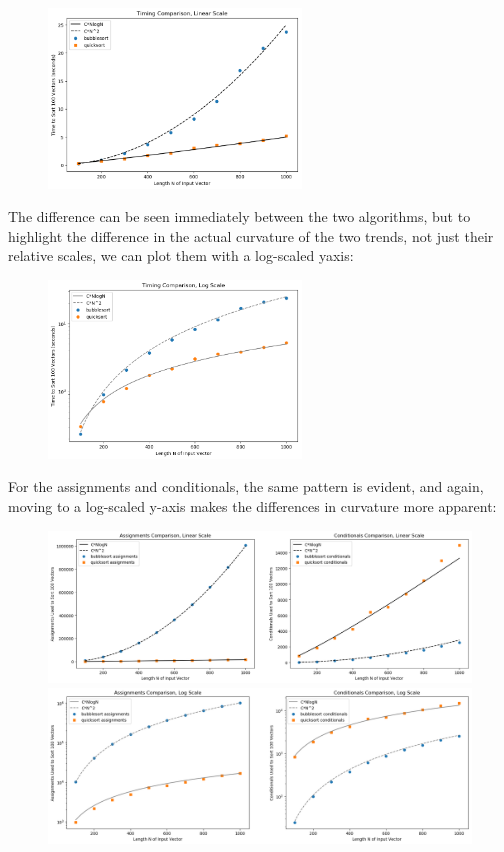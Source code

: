 \documentclass{article}
\begin{document}
\begin{figure}[h]
\centering
\includegraphics[width=0.6\textwidth]{hw1/fig3.png}
\end{figure}
The difference can be seen immediately between the two algorithms, but to highlight the difference in the actual curvature of the two trends, not just their relative scales, we can plot them with a log-scaled yaxis: \par
\begin{figure}[h]
\centering
\includegraphics[width=0.6\textwidth]{hw1/fig4.png}
\end{figure}
For the assignments and conditionals, the same pattern is evident, and again, moving to a log-scaled y-axis makes the differences in curvature more apparent: \par
\begin{figure}[h!]
\centering
\includegraphics[width=\textwidth]{hw1/fig1.png}
\includegraphics[width=\textwidth]{hw1/fig2.png}
\end{figure}
\end{document}
